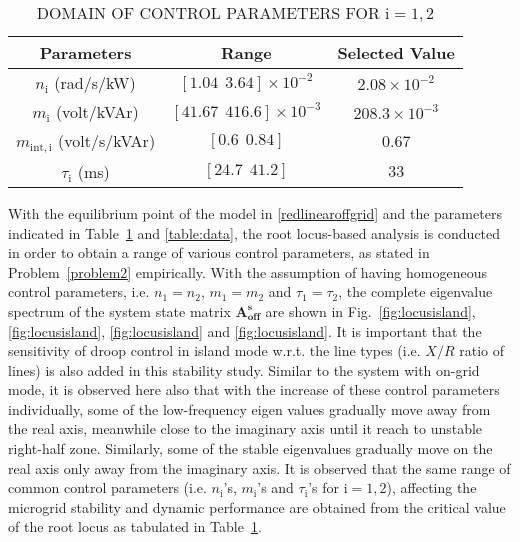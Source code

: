 \documentclass[journal]{IEEEtran}
\begin{document}
\renewcommand{\arraystretch}{1.2}
\begin{table}[t]
\centering
\caption{DOMAIN OF CONTROL PARAMETERS FOR $\mathrm{i}=1,2$}
\label{table:control}
\begin{tabular}{|c|c|c|}
\hline 
\textbf{Parameters} & \textbf{Range} & \textbf{Selected Value}    \\ \hline \hline
$n_\mathrm{i}$ (rad/s/kW) & $[1.04~~3.64]\times 10^{-2}$ & $2.08\times 10^{-2}$  \\ \hline
$m_\mathrm{i}$ (volt/kVAr) & $[41.67~~416.6]\times 10^{-3}$ & $208.3\times 10^{-3}$ \\ \hline
$m_\mathrm{int,i}$ (volt/s/kVAr) & $[0.6~~0.84]$ & $0.67$ \\ \hline
$\tau_\mathrm{i}$ (ms) & $[24.7~~41.2]$ & $33$\\ \hline
\end{tabular}
\end{table}
With the equilibrium point of the model in \eqref{redlinearoffgrid} and the parameters indicated in Table~\ref{table:control} and \ref{table:data}, the root locus-based analysis is conducted in order to obtain a range of various control parameters, as stated in Problem~\ref{problem2} empirically. With the assumption of having homogeneous control parameters, i.e. $n_\mathrm{1}=n_\mathrm{2}$, $m_\mathrm{1}=m_\mathrm{2}$ and $\tau_\mathrm{1}=\tau_\mathrm{2}$, the complete eigenvalue spectrum of the system state matrix $\mathbf{A}^\mathrm{\textbf{s}}_\mathrm{\textbf{off}}$ are shown in Fig.~\ref{fig:locusisland}, \ref{fig:locusisland}, \ref{fig:locusisland} and \ref{fig:locusisland}. It is important that the sensitivity of droop control in island mode w.r.t. the line types (i.e. $X/R$ ratio of lines) is also added in this stability study. Similar to the system with on-grid mode, it is observed here also that with the increase of these control parameters individually, some of the low-frequency eigen values gradually move away from the real axis, meanwhile close to the imaginary axis until it reach to unstable right-half zone. Similarly, some of the stable eigenvalues gradually move on the real axis only away from the imaginary axis. It is observed that the same range of common control parameters (i.e. $n_\mathrm{i}$'s, $m_\mathrm{i}$'s and $\tau_\mathrm{i}$'s for $\mathrm{i}=1, 2$), affecting the microgrid stability and dynamic performance are obtained from the critical value of the root locus as tabulated in Table~\ref{table:control}.
\end{document}
